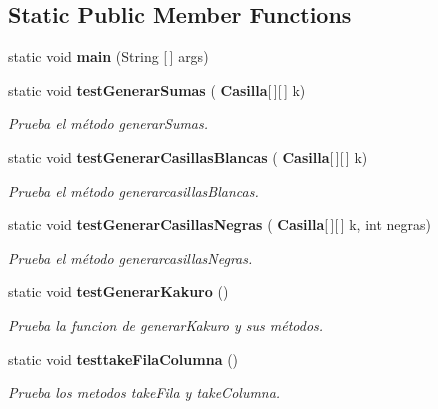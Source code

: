 \subsection*{Static Public Member Functions}
\begin{DoxyCompactItemize}
\item 
\mbox{\label{class_dominio_1_1controladores_1_1_drivers_1_1_driver_capa_dominio_kakuro_a31b15a500be1892e96d81c271adffacb}} 
static void {\bfseries main} (String [$\,$] args)
\item 
static void \textbf{ test\+Generar\+Sumas} (\textbf{ Casilla}[$\,$][$\,$] k)
\begin{DoxyCompactList}\small\item\em Prueba el método generar\+Sumas. \end{DoxyCompactList}\item 
static void \textbf{ test\+Generar\+Casillas\+Blancas} (\textbf{ Casilla}[$\,$][$\,$] k)
\begin{DoxyCompactList}\small\item\em Prueba el método generarcasillas\+Blancas. \end{DoxyCompactList}\item 
static void \textbf{ test\+Generar\+Casillas\+Negras} (\textbf{ Casilla}[$\,$][$\,$] k, int negras)
\begin{DoxyCompactList}\small\item\em Prueba el método generarcasillas\+Negras. \end{DoxyCompactList}\item 
\mbox{\label{class_dominio_1_1controladores_1_1_drivers_1_1_driver_capa_dominio_kakuro_a095bf6bb9987aef63fdead5fc182be9d}} 
static void \textbf{ test\+Generar\+Kakuro} ()
\begin{DoxyCompactList}\small\item\em Prueba la funcion de generar\+Kakuro y sus métodos. \end{DoxyCompactList}\item 
\mbox{\label{class_dominio_1_1controladores_1_1_drivers_1_1_driver_capa_dominio_kakuro_ae027d444962131c8f646fbe49ff23632}} 
static void \textbf{ testtake\+Fila\+Columna} ()
\begin{DoxyCompactList}\small\item\em Prueba los metodos take\+Fila y take\+Columna. \end{DoxyCompactList}\item 
\mbox{\label{class_dominio_1_1controladores_1_1_drivers_1_1_driver_capa_dominio_kakuro_a9b25ae87e75143633e0c393c7fce6c1a}} 

\end{DoxyCompactItemize}
